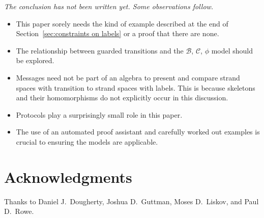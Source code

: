 \documentclass[12pt]{article}
\newenvironment{note}{\begingroup\itshape}{\endgroup}
\newcommand{\bun}{\ensuremath{\mathcal{B}}}
\newcommand{\comp}{\ensuremath{\mathcal{C}}}
\begin{document}
\begin{note}
  The conclusion has not been written yet.  Some observations follow.
\end{note}

\begin{itemize}
\item This paper sorely needs the kind of example described at the end
  of Section~\ref{sec:constraints on labels} or a proof that there are
  none.
\item The relationship between guarded transitions and the \bun, \comp,
  $\phi$ model should be explored.
\item Messages need not be part of an algebra to present and compare
  strand spaces with transition to strand spaces with labels.  This is
  because skeletons and their homomorphisms do not explicitly occur in
  this discussion.
\item Protocols play a surprisingly small role in this paper.
\item The use of an automated proof assistant and carefully worked out
  examples is crucial to ensuring the models are applicable.
\end{itemize}

\section*{Acknowledgments}\label{sec:aacknowledgments}
Thanks to Daniel J.~Dougherty, Joshua D.~Guttman, Moses D.~Liskov, and
Paul D.~Rowe.




\clearpage
\tableofcontents
\end{document}
